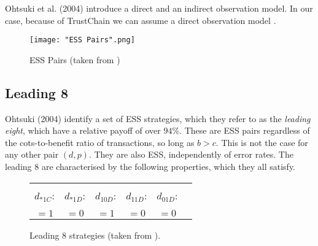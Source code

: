 \noindent{} Ohtsuki et al. (2004) introduce a direct and an indirect observation model. In our case, because of TrustChain we can assume a direct observation model \cite{How Should we Define Goodness}. 


{\centering
\begin{figure}[H]
\begin{center}
\texttt{[image: "ESS Pairs".png]}
\label{fig:ESS Pairs}
\caption{ESS Pairs (taken from \cite{The leading eight: Social norms that can maintain cooperation by indirect reciprocity})}
\end{center}
\end{figure}
}


\subsection{Leading 8}
\label{subsec:Leading 8}
Ohtsuki (2004) identify a set of ESS strategies, which they refer to as the {\it leading eight}, which have a relative payoff of over $94\%$. These are ESS pairs regardless of the cots-to-benefit ratio of transactions, so long as $b>c$. This is not the case for any other pair $(d,p).$ They are also ESS, independently of error rates. The leading 8 are characterised by the following properties, which they all satisfy.
\begin{figure}[H]
\begin{center}
\begin{tabular}{|c|c|c|c|c|c|}
\hline & & & & \\[-0.7ex] $d_{*1C}$: & $d_{*1D}$: & $d_{10D}$: & $d_{11D}$: & $d_{01D}$: \\[1.5ex] \hline & & & & \\[-0.7ex]
$=1$ & $=0$ & $=1$ & $=0$ & $=0$ \\[1ex]\hline
\end{tabular}
\label{fig:Leading 8 strategies}
\caption{Leading 8 strategies (taken from \cite{The leading eight: Social norms that can maintain cooperation by indirect reciprocity}).}
\end{center}
\end{figure}


